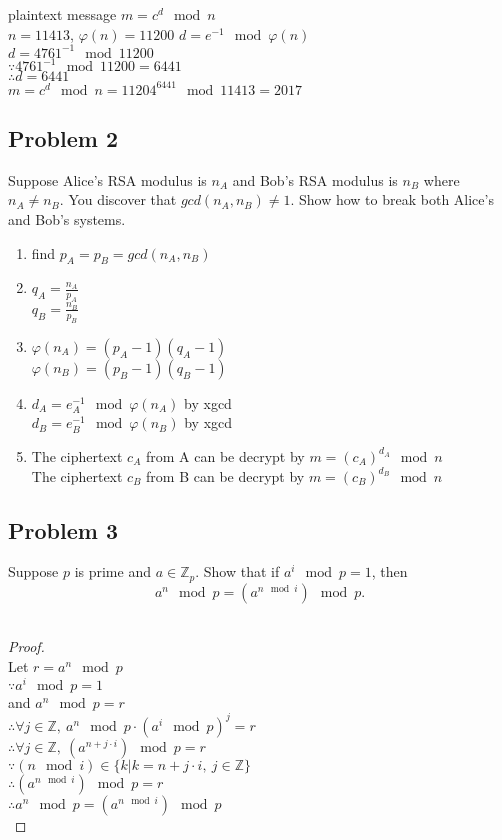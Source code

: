 \documentclass[paper=a4, fontsize=11pt]{scrartcl} %
\numberwithin{equation}{section} %
\numberwithin{figure}{section} %
\newcommand{\problem}[1]{\subsection *{Problem #1}}
\newcommand{\pnl}{$ $\newline\\}
\newcommand{\Z}{\mathbb{Z}}
\begin{document}
plaintext message $m = c^d \mod n$\\
$n = 11413$, $\varphi (n) = 11200$
$d = e^{-1} \mod \varphi (n)$\\
$d = 4761^{-1} \mod 11200$\\
$\because 4761^{-1} \mod 11200 = 6441$\\
$\therefore d=6441$\\
$m=c^d \mod n = 11204^6441 \mod 11413 = 2017$

\problem 2
Suppose Alice's RSA modulus is $n_A$ and Bob's RSA modulus is $n_B$
where $n_A \neq n_B$. You discover that $gcd(n_A, n_B) \neq 1$. Show how to
break both Alice's and Bob's systems.\\

\begin{enumerate}
\item find $p_A = p_B = gcd(n_A, n_B)$
\item $q_A = \frac{n_A}{p_A}$\\
$q_B = \frac{n_B}{p_B}$
\item $\varphi(n_A) = (p_A-1)(q_A-1)$\\
$\varphi(n_B) = (p_B-1)(q_B-1)$
\item $d_A = e_A^{-1} \mod \varphi(n_A)$ by xgcd\\ 
$d_B = e_B^{-1}\mod \varphi(n_B)$  by xgcd
\item The ciphertext $c_A$ from A can be decrypt by $m = (c_A)^{d_A} \mod n$\\
The ciphertext $c_B$ from B can be decrypt by $m=(c_B)^{d_B} \mod n$
\end{enumerate}

\problem 3
Suppose $p$ is prime and $a \in \Z_p$. Show that if $a^i\mod p = 1$, then
$$a^n\mod p = (a^{n \mod i})\mod p.$$\\

\begin{proof}
\pnl
Let $r = a^n \mod p$\\
$\because a^i\mod p = 1$\\
and $a^n\mod p = r$\\
$\therefore \forall j \in \Z,\ a^n\mod p \cdot (a^i\mod p)^j = r$\\
$\therefore \forall j \in \Z,\ (a^{n+j\cdot i})\mod p = r$\\
$\because (n \mod i) \in \{k | k = n+j\cdot i,\ j \in \Z\}$\\
$\therefore (a^{n\mod i})\mod p = r$\\
$\therefore  a^n \mod p = (a^{n\mod i})\mod p$\\
\end{proof}
\end{document}
